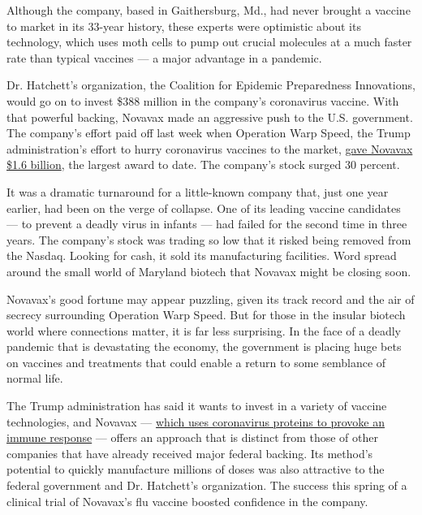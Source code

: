 Although the company, based in Gaithersburg, Md., had never brought a
vaccine to market in its 33-year history, these experts were optimistic
about its technology, which uses moth cells to pump out crucial
molecules at a much faster rate than typical vaccines --- a major
advantage in a pandemic.

Dr. Hatchett's organization, the Coalition for Epidemic Preparedness
Innovations, would go on to invest \$388 million in the company's
coronavirus vaccine. With that powerful backing, Novavax made an
aggressive push to the U.S. government. The company's effort paid off
last week when Operation Warp Speed, the Trump administration's effort
to hurry coronavirus vaccines to the market,
\href{https://www.nytimes3xbfgragh.onion/2020/07/07/health/novavax-coronavirus-vaccine-warp-speed.html}{gave
Novavax \$1.6 billion}, the largest award to date. The company's stock
surged 30 percent.

It was a dramatic turnaround for a little-known company that, just one
year earlier, had been on the verge of collapse. One of its leading
vaccine candidates --- to prevent a deadly virus in infants --- had
failed for the second time in three years. The company's stock was
trading so low that it risked being removed from the Nasdaq. Looking for
cash, it sold its manufacturing facilities. Word spread around the small
world of Maryland biotech that Novavax might be closing soon.

Novavax's good fortune may appear puzzling, given its track record and
the air of secrecy surrounding Operation Warp Speed. But for those in
the insular biotech world where connections matter, it is far less
surprising. In the face of a deadly pandemic that is devastating the
economy, the government is placing huge bets on vaccines and treatments
that could enable a return to some semblance of normal life.

The Trump administration has said it wants to invest in a variety of
vaccine technologies, and Novavax ---
\href{https://www.nytimes3xbfgragh.onion/interactive/2020/05/20/science/coronavirus-vaccine-development.html}{which
uses coronavirus proteins to provoke an immune response} --- offers an
approach that is distinct from those of other companies that have
already received major federal backing. Its method's potential to
quickly manufacture millions of doses was also attractive to the federal
government and Dr. Hatchett's organization. The success this spring of a
clinical trial of Novavax's flu vaccine boosted confidence in the
company.

